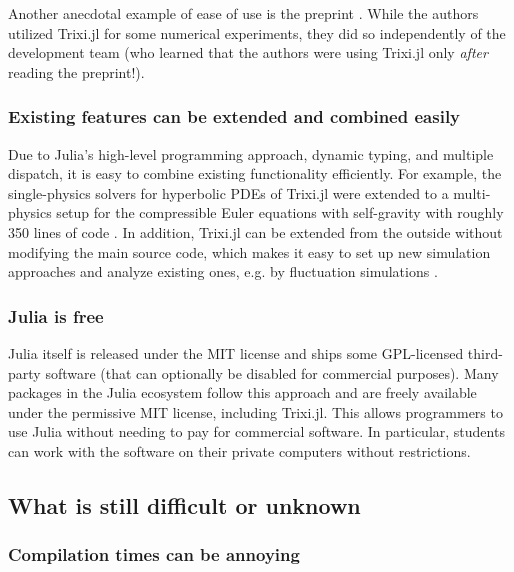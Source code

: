 \documentclass{juliacon}
\makeatletter
\newcommand{\eg}[0]{{e.g.\@}\xspace}
\newcommand{\trixi}{Trixi.jl\xspace}
\makeatother
\begin{document}
Another anecdotal example of ease of use is the preprint \cite{singh2021linear}. 
While the authors utilized \trixi for some numerical experiments, they did so 
independently of the development team (who learned that the authors were 
using \trixi only \textit{after} reading the preprint!). 

\subsubsection{Existing features can be extended and combined easily}

Due to Julia's high-level programming approach, dynamic typing, and multiple
dispatch, it is easy to combine existing functionality efficiently. For example,
the single-physics solvers for hyperbolic PDEs of \trixi were extended to
a multi-physics setup for the compressible Euler equations with self-gravity
with roughly 350 lines of code \cite{schlottkelakemper2021purely}.
In addition, \trixi can be extended from the outside without modifying the main
source code, which makes it easy to set up new simulation approaches and analyze
existing ones, \eg by fluctuation simulations \cite{ranocha2021preventing}.

\subsubsection{Julia is free}

Julia itself is released under the MIT license and ships some GPL-licensed
third-party software (that can optionally be disabled for commercial purposes).
Many packages in the Julia ecosystem follow this approach and are freely available
under the permissive MIT license, including \trixi. This allows programmers to use Julia
without needing to pay for commercial software. In particular, students can
work with the software on their private computers without restrictions.


\subsection{What is still difficult or unknown}

\subsubsection{Compilation times can be annoying}
\end{document}
